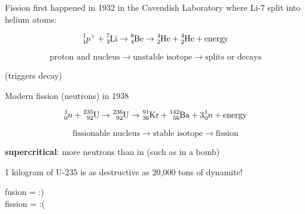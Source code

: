 \documentclass[a4paper, 12pt]{article}
\begin{document}
Fission first happened in 1932 in the Cavendish Laboratory where Li-7 split into helium atoms:

$$\ce{^{1}_{1}$p^+$} + \ce{^{7}_{3}Li} \to \ce{^{8}_{4}Be} \to \ce{^{4}_{2}He} + \ce{^{4}_{2}He} + \mathrm{energy}$$

$$\text{proton and nucleus} \to \text{unstable isotope} \to \text{splits or decays}$$

(triggers decay)

Modern fission (neutrons) in 1938

$$\ce{^{1}_{0}$n$} + \ce{^{235}_{92}U} \to \ce{^{236}_{92}U} \to \ce{^{91}_{36}Kr} + \ce{^{142}_{56}Ba} + 3\ce{^{1}_{0}$n$} + \text{energy}$$

$$\text{fissionable nucleus} \to \text{stable isotope} \to \text{fission}$$

\textbf{supercritical}: more neutrons than in (such as in a bomb)

1 kilogram of U-235 is as destructive as 20,000 tons of dynamite!

fusion = :) \\
fission = :(
\end{document}
